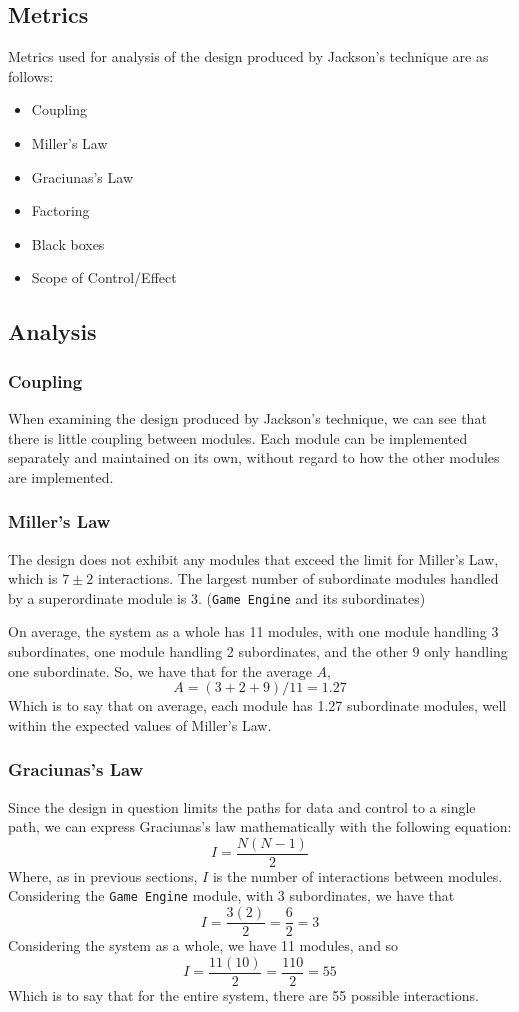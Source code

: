 \documentclass{article}
\begin{document}
	\subsection{Metrics}
		Metrics used for analysis of the design produced by Jackson's technique are as follows:
		\begin{itemize}
			\item Coupling
			\item Miller's Law
			\item Graciunas's Law
			\item Factoring
			\item Black boxes
			\item Scope of Control/Effect
		\end{itemize}
	\subsection{Analysis}
		\subsubsection{Coupling}
			When examining the design produced by Jackson's technique, we can see that there is little coupling between modules. Each module can be implemented separately and maintained on its own, without regard to how the other modules are implemented. 
		\subsubsection{Miller's Law}
			The design does not exhibit any modules that exceed the limit for Miller's Law, which is $7\pm2$ interactions. The largest number of subordinate modules handled by a superordinate module is 3. (\texttt{Game Engine} and its subordinates)
			
			On average, the system as a whole has 11 modules, with one module handling 3 subordinates, one module handling 2 subordinates, and the other 9 only handling one subordinate. So, we have that for the average $A$,
			$$A = (3 + 2 + 9)/11 = 1.27$$
			Which is to say that on average, each module has 1.27 subordinate modules, well within the expected values of Miller's Law.
		\subsubsection{Graciunas's Law}
			 Since the design in question limits the paths for data and control to a single path, we can express Graciunas's law mathematically with the following equation:
			 $$I = \frac{N(N-1)}{2}$$
			 Where, as in previous sections, $I$ is the number of interactions between modules. Considering the \texttt{Game Engine} module, with 3 subordinates, we have that 
			 $$I = \frac{3(2)}{2} = \frac{6}{2} = 3$$
			 Considering the system as a whole, we have 11 modules, and so 
			 $$I = \frac{11(10)}{2} = \frac{110}{2} = 55$$
			 Which is to say that for the entire system, there are 55 possible interactions. 
\end{document}

